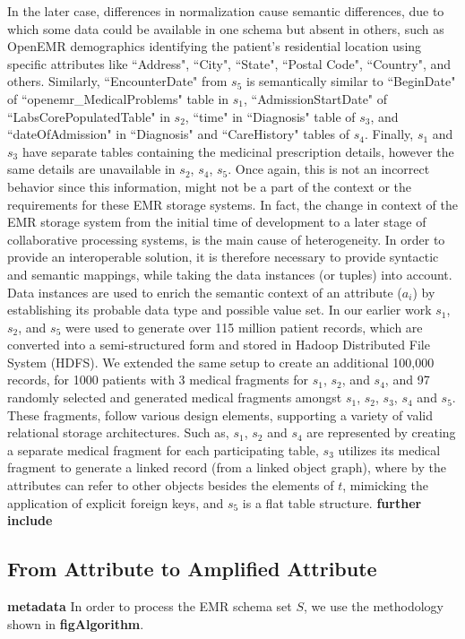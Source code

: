 In the later case, differences in normalization cause semantic differences, due to which some data could be available in one schema but absent in others, such as OpenEMR demographics identifying the patient's residential location using specific attributes like ``Address", ``City", ``State", ``Postal Code", ``Country", and others. Similarly, ``EncounterDate" from $s_5$ is semantically similar to ``BeginDate" of ``openemr\_MedicalProblems" table in $s_1$, ``AdmissionStartDate" of ``LabsCorePopulatedTable" in $s_2$, 
``time" in ``Diagnosis" table of $s_3$, and  ``dateOfAdmission" in ``Diagnosis" and ``CareHistory" tables of $s_4$.
Finally, $s_1$ and $s_3$ have separate tables containing the medicinal prescription details, however the same details are unavailable in $s_2$, $s_4$, $s_5$. Once again, this is not an incorrect behavior since this information, might not be a part of the context or the requirements for these EMR storage systems.
In fact, the change in context of the EMR storage system from the initial time of development to a later stage of collaborative processing systems, is the main cause of heterogeneity.
In order to provide an interoperable solution, it is therefore necessary to provide syntactic and semantic mappings, while taking the data instances (or tuples) into account. Data instances are used to enrich the semantic context of an attribute ($a_i$) by establishing its probable data type and possible value set. 
In our earlier work \cite{Satti2020} $s_1$, $s_2$, and $s_5$ were used to generate over 115 million patient records, which are converted into a semi-structured form and stored in Hadoop Distributed File System (HDFS). We extended the same setup to create an additional 100,000 records, for 1000 patients with 3 medical fragments for $s_1$, $s_2$, and $s_4$, and 97 randomly selected and generated medical fragments amongst $s_1$, $s_2$, $s_3$, $s_4$ and $s_5$. These fragments, follow various design elements, supporting a variety of valid relational storage architectures. Such as, $s_1$, $s_2$ and $s_4$ are represented by creating a separate medical fragment for each participating table, $s_3$ utilizes its medical fragment to generate a linked record (from a linked object graph), where by the attributes can refer to other objects besides the elements of $t$, mimicking the application of explicit foreign keys, and $s_5$ is a flat table structure. \textbf{further include}

\subsection*{From Attribute to Amplified Attribute}
\label{schema_prepro}
\textbf{metadata}
In order to process the EMR schema set $S$, we use the methodology shown in \textbf{figAlgorithm}.

